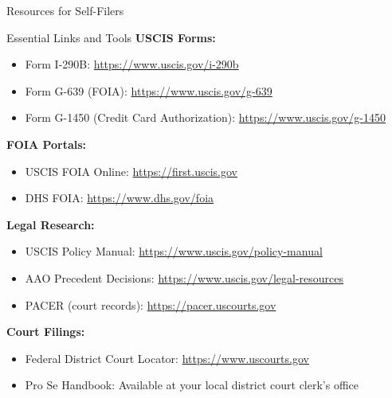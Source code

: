 \documentclass[11pt]{beamer}
\begin{document}
	
	\begin{frame}{Resources for Self-Filers}
		\scriptsize
		\begin{block}{Essential Links and Tools}
			\textbf{USCIS Forms:}
			\begin{itemize}
				\item Form I-290B: \url{https://www.uscis.gov/i-290b}
				\item Form G-639 (FOIA): \url{https://www.uscis.gov/g-639}
				\item Form G-1450 (Credit Card Authorization): \url{https://www.uscis.gov/g-1450}
			\end{itemize}
			\textbf{FOIA Portals:}
			\begin{itemize}
				\item USCIS FOIA Online: \url{https://first.uscis.gov}
				\item DHS FOIA: \url{https://www.dhs.gov/foia}
			\end{itemize}
			\textbf{Legal Research:}
			\begin{itemize}
				\item USCIS Policy Manual: \url{https://www.uscis.gov/policy-manual}
				\item AAO Precedent Decisions: \url{https://www.uscis.gov/legal-resources}
				\item PACER (court records): \url{https://pacer.uscourts.gov}
			\end{itemize}
			\textbf{Court Filings:}
			\begin{itemize}
				\item Federal District Court Locator: \url{https://www.uscourts.gov}
				\item Pro Se Handbook: Available at your local district court clerk's office
			\end{itemize}
		\end{block}
	\end{frame}
	
\end{document}
